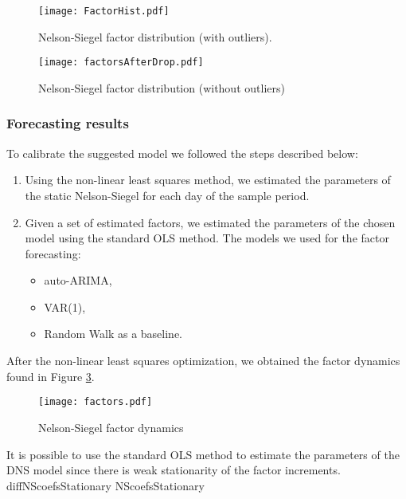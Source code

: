            \begin{figure}
                \texttt{[image: FactorHist.pdf]}
                \caption{Nelson-Siegel factor distribution (with outliers).}
                \label{fig:NSHistOutliers}
            \end{figure}

            \begin{figure}
                \texttt{[image: factorsAfterDrop.pdf]}
                \caption{Nelson-Siegel factor distribution (without outliers)}
                \label{fig:NSHistDropped}
            \end{figure}

        \subsubsection{Forecasting results}
            To calibrate the suggested model we followed the steps described below:
            \begin{enumerate}
                \item Using the non-linear least squares method, we estimated the parameters of the static Nelson-Siegel 
                for each day of the sample period.
                \item Given a set of estimated factors, we estimated the parameters of the chosen model using the standard 
                OLS method. The models we used for the factor forecasting:
                    \begin{itemize}
                        \item auto-ARIMA,
                        \item VAR(1),
                        \item Random Walk as a baseline.
                    \end{itemize}
            \end{enumerate}

            After the non-linear least squares optimization, we obtained the factor dynamics found in Figure \ref{fig:factordynamics}.
            \begin{figure}
                \texttt{[image: factors.pdf]}
                \caption{Nelson-Siegel factor dynamics}
                \label{fig:factordynamics}
            \end{figure}

            It is possible to use the standard OLS method to estimate the parameters of the DNS model since there is 
            weak stationarity of the factor increments. 
            {diffNScoefsStationary}
            {NScoefsStationary}

